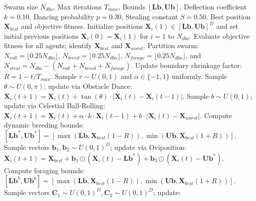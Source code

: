 \documentclass[journal,compsoc]{IEEEtran}
\begin{document}
\begin{algorithm}[!t]
\caption{Dung Beetle Optimization (DBO) Sub-Population}
\label{alg:dbo}
\begin{algorithmic}[1]
\REQUIRE Swarm size $N_{dbo}$, Max iterations $T_{max}$, Bounds $[\mathbf{Lb}, \mathbf{Ub}]$, Deflection coefficient $k=0.10$, Dancing probability $p=0.30$, Stealing constant $S=0.50$.
\ENSURE Best position $\mathbf{X}_{best}$ and objective fitness.
\STATE Initialize positions $\mathbf{X}_i(1) \in [\mathbf{Lb}, \mathbf{Ub}]^D$ and set initial previous positions $\mathbf{X}_i(0) = \mathbf{X}_i(1)$ for $i=1$ to $N_{dbo}$.
\STATE Evaluate objective fitness for all agents; identify $\mathbf{X}_{best}$ and $\mathbf{X}_{worst}$.
\STATE Partition swarm: $N_{roll} = \lfloor 0.25 N_{dbo} \rfloor$, $N_{breed} = \lfloor 0.25 N_{dbo} \rfloor$, $N_{forage} = \lfloor 0.25 N_{dbo} \rfloor$, and $N_{steal} = N_{dbo} - (N_{roll} + N_{breed} + N_{forage})$.
    \STATE Update boundary shrinkage factor: $R = 1 - t / T_{max}$.
        \STATE Sample $r \sim U(0, 1)$ and $\alpha \in \{-1, 1\}$ uniformly.
            \STATE Sample $\theta \sim U(0, \pi)$; update via Obstacle Dance: \\
            $\mathbf{X}_i(t+1) = \mathbf{X}_i(t) + \tan(\theta) \cdot |\mathbf{X}_i(t) - \mathbf{X}_i(t-1)|$.
        \ELSE
            \STATE Sample $b \sim U(0, 1)$; update via Celestial Ball-Rolling: \\
            $\mathbf{X}_i(t+1) = \mathbf{X}_i(t) + \alpha \cdot k \cdot \mathbf{X}_i(t-1) + b \cdot |\mathbf{X}_i(t) - \mathbf{X}_{worst}|$.
        \ENDIF
    \ENDFOR
    \STATE Compute dynamic breeding bounds: $[\mathbf{Lb}^*, \mathbf{Ub}^*] = [\max(\mathbf{Lb}, \mathbf{X}_{best}(1-R)), \min(\mathbf{Ub}, \mathbf{X}_{best}(1+R))]$.
        \STATE Sample vectors $\mathbf{b}_1, \mathbf{b}_2 \sim U(0, 1)^D$; update via Oviposition: \\
        $\mathbf{X}_i(t+1) = \mathbf{X}_{best} + \mathbf{b}_1 \odot (\mathbf{X}_i(t) - \mathbf{Lb}^*) + \mathbf{b}_2 \odot (\mathbf{X}_i(t) - \mathbf{Ub}^*)$.
    \ENDFOR
    \STATE Compute foraging bounds: $[\mathbf{Lb}^b, \mathbf{Ub}^b] = [\max(\mathbf{Lb}, \mathbf{X}_{best}(1-R)), \min(\mathbf{Ub}, \mathbf{X}_{best}(1+R))]$.
        \STATE Sample vectors $\mathbf{C}_1 \sim U(0, 1)^D, \mathbf{C}_2 \sim U(0, 1)^D$; update: \\

\end{algorithmic}
\end{algorithm}
\end{document}
